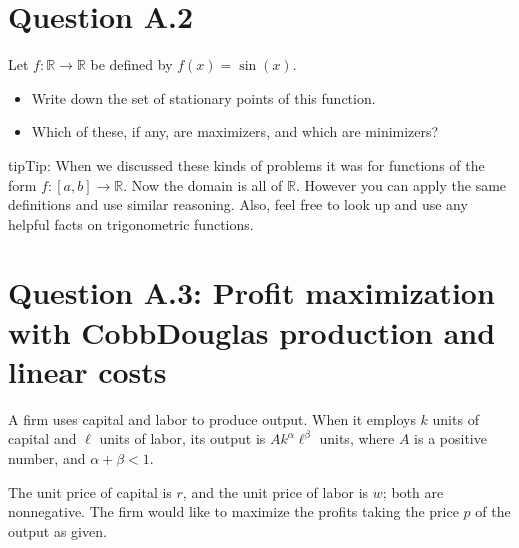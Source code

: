 \documentclass[letterpaper,10pt,english]{jupyterBook}
\begin{document}
\section{Question A.2}
\label{\detokenize{02.exercises:question-a-2}}
\sphinxAtStartPar
Let \(f \colon \mathbb{R} \to \mathbb{R}\) be defined by \(f(x) = \sin(x)\).
\begin{itemize}
\item {} 
\sphinxAtStartPar
Write down the set of stationary points of this function.

\item {} 
\sphinxAtStartPar
Which of these, if any, are maximizers, and which are minimizers?

\end{itemize}

\begin{sphinxadmonition}{tip}{Tip:}
\sphinxAtStartPar
When we discussed these kinds of problems it was for functions of the form \(f \colon [a, b] \to \mathbb{R}\).  Now the domain is all of \(\mathbb{R}\).
However you can apply the same definitions and use similar reasoning.  Also, feel free to look up and use any helpful facts on trigonometric functions.
\end{sphinxadmonition}


\section{Question A.3: Profit maximization with Cobb\sphinxhyphen{}Douglas production and linear costs}
\label{\detokenize{02.exercises:question-a-3-profit-maximization-with-cobb-douglas-production-and-linear-costs}}
\sphinxAtStartPar
A firm uses capital and labor to produce output.
When it employs \(k\) units of capital and \(\ell\) units of labor, its output is \(A k^{\alpha} \ell^{\beta}\) units, where \(A\) is a positive number, and \(\alpha + \beta < 1\).

\sphinxAtStartPar
The unit price of capital is \(r\), and the unit price of labor is \(w\); both are non\sphinxhyphen{}negative.
The firm would like to maximize the profits taking the price \(p\) of the output as given.
\end{document}
